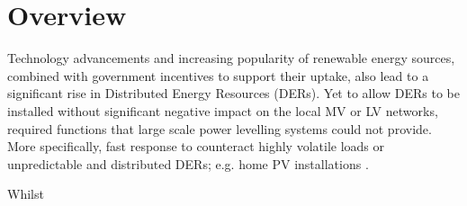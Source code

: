 \section{Overview}
\label{ch-review:sec:overview}


Technology advancements and increasing popularity of renewable energy sources, combined with government incentives to support their uptake, also lead to a significant rise in Distributed Energy Resources (DERs).
Yet to allow DERs to be installed without significant negative impact on the local MV or LV networks, required functions that large scale power levelling systems could not provide. More specifically, fast response to counteract highly volatile loads or unpredictable and distributed DERs; e.g. home PV installations \cite{Jewell1987}. 



Whilst 